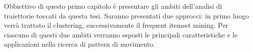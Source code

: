 Obbiettivo di questo primo capitolo è presentare gli ambiti dell'analisi di traiettorie toccati da questa tesi.
Saranno presentati due approcci: in primo luogo verrà trattato il clustering, successivamente il frequent itemset mining.
Per ciascuno di questi due ambiti verranno esposti le principali caratteristiche e le applicazioni nella ricerca di pattern di movimento.